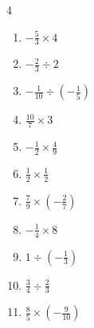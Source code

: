 \begin{multicols}{4}
\begin{enumerate}
  \item $\displaystyle -\frac{5}{3}\times{}4$


\columnbreak %

\resetques

  \item $\displaystyle -\frac{2}{3}\div{}2$


  \item $\displaystyle -\frac{1}{10}\div{}\left(-\frac{1}{5}\right)$


  \item $\displaystyle \frac{10}{7}\times{}3$


  \item $\displaystyle -\frac{1}{2}\times{}\frac{4}{9}$


  \item $\displaystyle \frac{1}{2}\times{}\frac{1}{2}$


  \item $\displaystyle \frac{7}{9}\times{}\left(-\frac{2}{7}\right)$


  \item $\displaystyle -\frac{1}{4}\times{}8$

        \phantom{$\displaystyle =-2$}

  \item $\displaystyle 1\div{}\left(-\frac{1}{3}\right)$

        \phantom{$\displaystyle =-3$}

  \item $\displaystyle \frac{3}{4}\div{}\frac{2}{3}$


  \item $\displaystyle \frac{8}{5}\times{}\left(-\frac{9}{10}\right)$


\columnbreak %


\end{enumerate}
\end{multicols}
